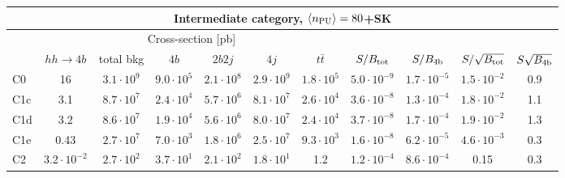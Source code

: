 \begin{tabular}{|l|cc|cccc|cccc|}
  \hline
\multicolumn{11}{|c|}{Intermediate category, $\left\langle n_{\rm PU}\right\rangle=80$+SK}\\
\hline
&  \multicolumn{6}{c|}{Cross-section [pb]} &  &  & &  \\
   &  $hh\to 4b$ &  total bkg  &   $4b$    &  $2b2j$   &   $4j$    &
$t\bar{t}$ &
$S/B_{\rm tot}$ & $S/B_{\rm 4b}$ & $S/\sqrt{B_{\rm tot}}$ & $S\sqrt{B_{\rm 4b}}$ \\
  \hline
  \hline
C0      & 16  &   $3.1\cdot 10^9$   & $9.0\cdot 10^5$ &  $2.1\cdot 10^8$ & $2.9\cdot 10^9$ & $1.8\cdot 10^5$ &   $5.0\cdot 10^{-9}$   & $1.7\cdot 10^{-5}$ &    $1.5\cdot 10^{-2}$   & 0.9\\
 C1c     & 3.1  &   $8.7\cdot 10^7 $  & $2.4\cdot 10^4$ & $5.7\cdot 10^6$ & $8.1\cdot 10^7$ & $2.6\cdot 10^4$ &   $3.6\cdot 10^{-8}$   & $1.3\cdot 10^{-4}$ &  $1.8\cdot 10^{-2}$    & 1.1 \\ 
 C1d     & 3.2  &   $8.6\cdot 10^7 $  & $1.9\cdot 10^4$ & $5.6\cdot 10^6$ & $8.0\cdot 10^7$ & $2.4\cdot 10^4$  &   $3.7\cdot 10^{-8}$   & $1.7\cdot 10^{-4}$ &   $1.9\cdot 10^{-2}$   & 1.3 \\
 C1e     & 0.43  &   $2.7\cdot 10^7$   & $7.0\cdot 10^3$ & $1.8\cdot 10^6$ & $2.5\cdot 10^7$ & $9.3\cdot 10^3$  &   $1.6\cdot 10^{-8}$   & $6.2\cdot 10^{-5}$  &     $4.6\cdot 10^{-3}$   & 0.3 \\
 C2      & $3.2\cdot 10^{-2}$  &   $2.7\cdot 10^2$   & $3.7\cdot 10^1$ & $2.1\cdot 10^2$ & $1.8\cdot 10^1$ & 1.2 &  $ 1.2\cdot 10^{-4}$   & $8.6\cdot 10^{-4}$  &      0.15   & 0.3 \\
\hline
\end{tabular}
